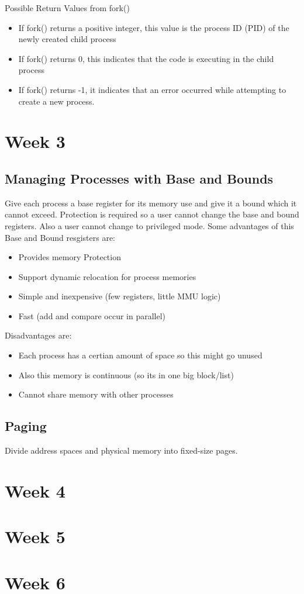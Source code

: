 \documentclass[12pt, letterpaper]{article}
\begin{document}
Possible Return Values from fork()\\ 
\begin{itemize}
    \item If fork() returns a positive integer, this value is the process ID (PID) of the newly created child process
    \item If fork() returns 0, this indicates that the code is executing in the child process
    \item If fork() returns -1, it indicates that an error occurred while attempting to create a new process. 
\end{itemize}

\section*{Week 3}
\subsection*{Managing Processes with Base and Bounds}
Give each process a base register for its memory use and give 
it a bound which it cannot exceed. Protection is required 
so a user cannot change the base and bound registers. 
Also a user cannot change to privileged mode. 
Some advantages of this Base and Bound resgisters are:
\begin{itemize}
    \item Provides memory Protection
    \item Support dynamic relocation for process memories
    \item Simple and inexpensive (few registers, little MMU logic)
    \item Fast (add and compare occur in parallel)
\end{itemize}
Disadvantages are:
\begin{itemize}
    \item Each process has a certian amount of space so this might go unused 
    \item Also this memory is continuous (so its in one big block/list)
    \item Cannot share memory with other processes
\end{itemize}

\subsection*{Paging}
Divide address spaces and physical memory into fixed-size pages. 

\section*{Week 4}

\section*{Week 5}

\section*{Week 6}
\end{document}
